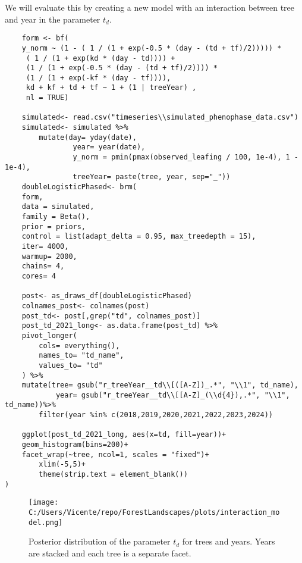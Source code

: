 \documentclass{article}
\begin{document}
We will evaluate this by creating a new model with an interaction between tree and year in the parameter $t_d$.

\begin{verbatim}
    form <- bf(
    y_norm ~ (1 - ( 1 / (1 + exp(-0.5 * (day - (td + tf)/2))))) *
     ( 1 / (1 + exp(kd * (day - td)))) +
     (1 / (1 + exp(-0.5 * (day - (td + tf)/2)))) *
     (1 / (1 + exp(-kf * (day - tf)))),
     kd + kf + td + tf ~ 1 + (1 | treeYear) ,
     nl = TRUE)

    simulated<- read.csv("timeseries\\simulated_phenophase_data.csv")
    simulated<- simulated %>%
        mutate(day= yday(date),
                year= year(date),
                y_norm = pmin(pmax(observed_leafing / 100, 1e-4), 1 - 1e-4),
                treeYear= paste(tree, year, sep="_"))
    doubleLogisticPhased<- brm(
    form,
    data = simulated,
    family = Beta(),
    prior = priors,
    control = list(adapt_delta = 0.95, max_treedepth = 15),
    iter= 4000,
    warmup= 2000,
    chains= 4,
    cores= 4

    post<- as_draws_df(doubleLogisticPhased)
    colnames_post<- colnames(post)
    post_td<- post[,grep("td", colnames_post)]
    post_td_2021_long<- as.data.frame(post_td) %>%
    pivot_longer(
        cols= everything(),
        names_to= "td_name",
        values_to= "td"
    ) %>% 
    mutate(tree= gsub("r_treeYear__td\\[([A-Z])_.*", "\\1", td_name),
            year= gsub("r_treeYear__td\\[[A-Z]_(\\d{4}),.*", "\\1", td_name))%>%
        filter(year %in% c(2018,2019,2020,2021,2022,2023,2024))

    ggplot(post_td_2021_long, aes(x=td, fill=year))+
    geom_histogram(bins=200)+
    facet_wrap(~tree, ncol=1, scales = "fixed")+
        xlim(-5,5)+
        theme(strip.text = element_blank())
)
\end{verbatim}

\begin{figure}
    \centering
    \texttt{[image: C:/Users/Vicente/repo/ForestLandscapes/plots/interaction\_model.png]}
    \caption{Posterior distribution of the parameter $t_d$ for trees and years. Years are stacked and each tree is a separate facet.}
    \label{fig:td_posterior_treeE_year}
\end{figure}
\end{document}
